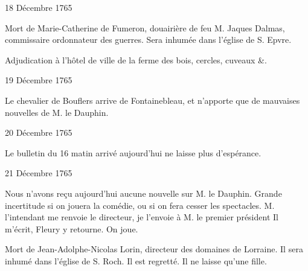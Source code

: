                      \begin{diary}{18 Décembre 1765}{}
                        
                         Mort de Marie-Catherine de Fumeron,
                           douairière de feu M. Jaques Dalmas,
                           commissaire ordonnateur des guerres. Sera
                           inhumée dans l’église de S.
                              Epvre. \bigskip
        
        
                        
                           Adjudication à l'hôtel de ville de
                           la ferme
                           des bois, cercles, cuveaux &. \bigskip
        
        
                     \end{diary}

                     \begin{diary}{19 Décembre 1765}{}
                        
                        
                           Le chevalier de Bouflers arrive de Fontainebleau,
                           et n'apporte que de mauvaises nouvelles
                           de M. le Dauphin. \bigskip
        
        
                     \end{diary}

                     \begin{diary}{20 Décembre 1765}{}
                        
                         Le bulletin du 16
                              matin arrivé
                           aujourd'hui ne laisse plus d'espérance. \bigskip
        
        
                     \end{diary}

                     \begin{diary}{21 Décembre 1765}{}
                        
                         Nous n'avons reçu aujourd'hui aucune nouvelle
                           sur M. le Dauphin.
                           Grande incertitude si on
                           jouera la comédie, ou si on fera cesser les
                           spectacles. M. l'intendant
                           me renvoie le
                              directeur, je l'envoie à M. le premier président
                           Il m'écrit, Fleury y retourne.
                           On joue. \bigskip
        
        
                         Mort de Jean-Adolphe-Nicolas Lorin,
                           directeur
                           des domaines de Lorraine. Il sera
                           inhumé dans l’église de S.
                              Roch. Il est
                           regretté. Il ne laisse qu'une fille. \bigskip
        
        
                     \end{diary}

